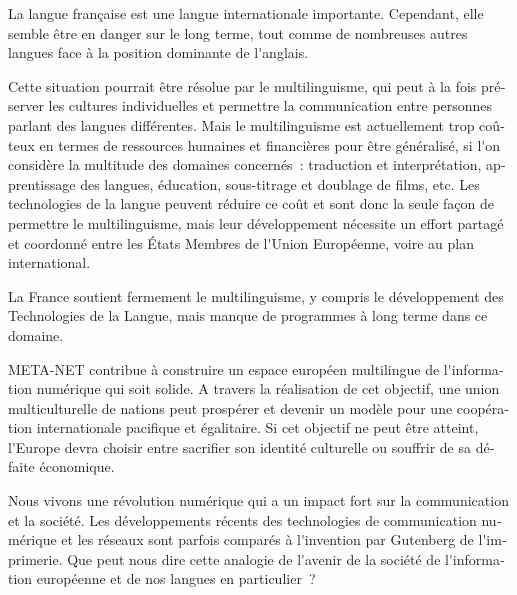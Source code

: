 \documentclass[]{../metanetpaper}
\begin{document}
\begin{french}
\begin{multicols}{2}
\begin{itemize}
\end{itemize}

La langue française est une langue internationale
importante. Cependant, elle semble être en danger sur le long terme,
tout comme de nombreuses autres langues face à la position dominante
de l{\mbox '}anglais.

Cette situation pourrait être résolue par le multilinguisme, qui peut
à la fois préserver les cultures individuelles et permettre la
communication entre personnes parlant des langues différentes. Mais le
multilinguisme est actuellement trop coûteux en termes de ressources
humaines et financières pour être généralisé, si l{\mbox '}on
considère la multitude des domaines concernés~: traduction et
interprétation, apprentissage des langues, éducation, sous-titrage et
doublage de films, etc. Les technologies de la langue peuvent
réduire ce coût et sont donc la seule façon de permettre le
multilinguisme, mais leur développement nécessite un effort partagé et
coordonné entre les États Membres de l{\mbox '}Union Européenne, voire
au plan international.

La France soutient fermement le multilinguisme, y compris le
développement des Technologies de la Langue, mais manque de programmes
à long terme dans ce domaine.

META-NET contribue à construire un espace européen multilingue de
l{\mbox '}information numérique qui soit solide. A travers la
réalisation de cet objectif, une union multiculturelle de nations peut
prospérer et devenir un modèle pour une coopération internationale
pacifique et égalitaire. Si cet objectif ne peut être atteint, l{\mbox
  '}Europe devra choisir entre sacrifier son identité culturelle ou
souffrir de sa défaite économique.

\end{multicols}

\clearpage


\begin{multicols}{2}

Nous vivons une révolution numérique qui a un impact fort
sur la communication et la société. Les développements récents des
technologies de communication numérique et les réseaux sont parfois
comparés à l{\mbox '}invention par Gutenberg de l{\mbox '}imprimerie. Que peut nous
dire cette analogie de l{\mbox '}avenir de la société de l{\mbox '}information
européenne et de nos langues en particulier~?


\end{multicols}
\end{french}
\end{document}
